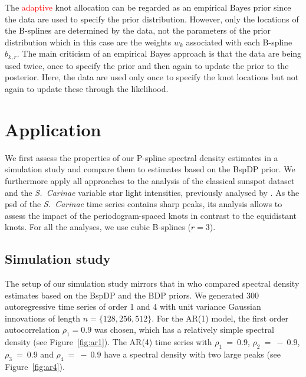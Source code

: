 \documentclass[twocolumn,final]{svjour3}
\begin{document}
The \textcolor{red}{adaptive}  knot allocation can be regarded as an empirical Bayes prior since the data are used to specify the prior distribution.  However, only the locations of the B-splines are determined by the data, not the parameters of the prior distribution which in this case are the weights $w_k$ associated with each B-spline $b_{k,r}$.  The main criticism of an empirical Bayes approach is that the data are being used twice, once to specify the prior and then again to update the prior to the posterior. Here, the data are used only once to specify the knot locations but not again to update these through the likelihood.



\section{Application}
\label{sec:application}

We first assess the properties of our P-spline spectral density estimates in a simulation study and compare them to estimates based on the BspDP prior. We furthermore apply all approaches to the
analysis of the classical sunspot dataset  and the {\it S.\ Carinae} variable star light intensities, previously analysed by \cite{Cart:1997,Huerta:1999,Kirch:2018}.  As the psd of the  {\it S.\ Carinae} time series contains sharp peaks, its analysis allows to assess the impact of the periodogram-spaced knots in contrast to the equidistant knots.   For all the analyses, we use cubic B-splines ($r=3$).

\subsection{Simulation study}

The setup of our simulation study mirrors that  in \cite{Edwards2019} who  compared spectral density estimates based on the BspDP and the BDP priors. 
We generated  300  autoregressive time series of order 1 and 4 with unit variance Gaussian innovations of length $n = \{128, 256, 512\}$.
For the AR(1) model, the  first  order autocorrelation $\rho_1 = 0.9$ was chosen, which has a relatively simple spectral density (see Figure~\ref{fig:ar1}).  The AR(4) time series with $\rho_1~=~0.9$, $\rho_2~=~-~0.9$, $\rho_3~=~0.9$ and $\rho_4~=~-~0.9$ have a spectral density with two large peaks (see Figure~\ref{fig:ar4}).  
\end{document}
